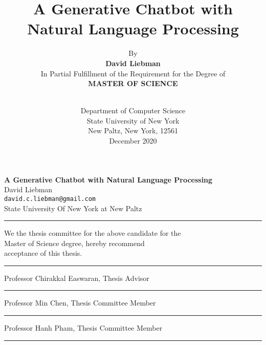 \documentclass[notitlepage]{report}
\begin{document}

\title{\textbf{A Generative Chatbot with Natural Language Processing }}

\author{By \\ \textbf{David Liebman } \\
In Partial Fulfillment of the Requirement for the Degree of \\
\textbf{MASTER OF SCIENCE } \\ \\}



\date{
Department of Computer Science \\
State University of New York \\ 
New Paltz, New York, 12561 \\ 
December 2020
}
\maketitle		
		



\newpage

\begin{center}
	\textbf{\large A Generative Chatbot with Natural Language Processing} \\
	David Liebman \\
	\texttt{david.c.liebman@gmail.com} \\
	State University Of New York at New Paltz \\
	\vspace{1cm}
	\hrule
	\vspace{1cm}
	We the thesis committee for the above candidate for the \\
	Master of Science degree, hereby recommend \\
	acceptance of this thesis. \\
		\vspace{1cm}
	\hrule
		\vspace{1cm}
	Professor Chirakkal Easwaran, Thesis Advisor \\
		\vspace{1cm}
	\hrule
		\vspace{1cm}
	Professor Min Chen, Thesis Committee Member \\
		\vspace{1cm}
	\hrule
		\vspace{1cm}
	Professor Hanh Pham, Thesis Committee Member \\
		\vspace{1cm}
	\hrule
		\vspace{1cm}
\end{center}
\end{document}
